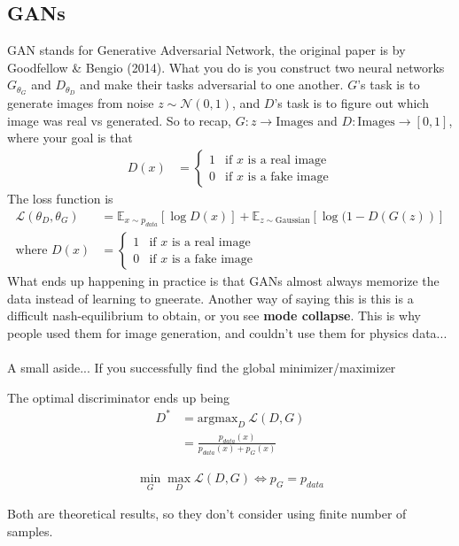 \subsection{GANs}
GAN stands for Generative Adversarial Network, the original paper is by Goodfellow \& Bengio (2014). What you do is you construct two neural networks $G_{\theta_G}$ and $D_{\theta_D}$ and make their tasks adversarial to one another. $G$'s task is to generate images from noise $z \sim \mathcal N(0,1)$, and $D$'s task is to figure out which image was real vs generated. So to recap, $G: z \to \text{Images}$ and $D: \text{Images} \to [0,1]$, where your goal is that 
\begin{align}
	D(x) & = \begin{cases}
		1 & \text{if } x \text{ is a real image}\\
		0 & \text{if } x \text{ is a fake image}
	\end{cases}
\end{align}
The loss function is
\begin{align}
	\mathcal L(\theta_D, \theta_G) & = \mathbb E_{x \sim p_{data}}[\log D(x)] + \mathbb E_{z \sim \text{Gaussian}}[\log (1 - D(G(z))]\\
	\text{where } D(x) & = \begin{cases}
		1 & \text{if } x \text{ is a real image}\\
		0 & \text{if } x \text{ is a fake image}
	\end{cases}
\end{align}
What ends up happening in practice is that GANs almost always memorize the data instead of learning to gneerate. Another way of saying this is this is a difficult nash-equilibrium to obtain, or you see \textbf{mode collapse}. This is why people used them for image generation, and couldn't use them for physics data...\\
\\
A small aside... If you successfully find the global minimizer/maximizer
\begin{lemma}
	The optimal discriminator ends up being
	\begin{align}
		D^* & = \text{argmax}_D ~\mathcal L(D,G)\\
		& = \frac{p_{data}(x)}{p_{data}(x) + p_{G}(x)}
	\end{align}	
\end{lemma}
\begin{theorem}
	\begin{align}
		\min_G \max_D \mathcal L(D,G) \iff p_G = p_{data}
	\end{align}
\end{theorem}
Both are theoretical results, so they don't consider using finite number of samples.

